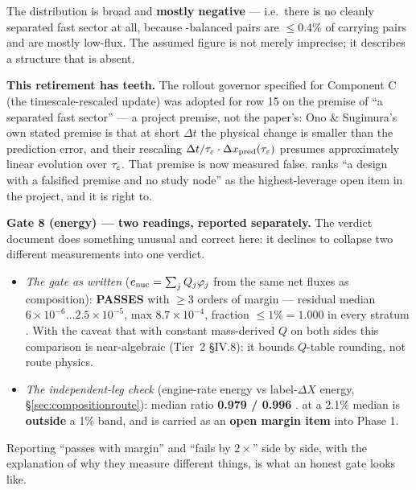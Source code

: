 The distribution is broad and \textbf{mostly negative} --- i.e.\ there is no
cleanly separated fast sector at all, because \kap-balanced pairs are
$\le 0.4\%$ of carrying pairs and are mostly low-flux. The assumed figure is not
merely imprecise; it describes a structure that is absent.

\textbf{This retirement has teeth.} The rollout governor specified for
Component C (the \citealt{ono2026} timescale-rescaled update) was adopted for
row 15 on the premise of ``a separated fast sector'' --- a project premise, not
the paper's: Ono \& Sugimura's own stated premise is that at short $\Delta t$
the physical change is smaller than the prediction error, and their rescaling
$\Delta t/\tau_{\varepsilon} \cdot \Delta x_{\mathrm{pred}}(\tau_{\varepsilon})$ presumes
approximately linear evolution over $\tau_{\varepsilon}$. That premise is now measured
false.  ranks ``a design with a falsified premise and no study
node'' as the highest-leverage open item in the project, and it is right to.

\textbf{Gate 8 (energy) --- two readings, reported separately.} The verdict
document does something unusual and correct here: it declines to collapse two
different measurements into one verdict.

\begin{itemize}
\item \emph{The gate as written} ($e_{\mathrm{nuc}} = \sum_j Q_j \varphi_j$ from the same
  net fluxes as composition): \textbf{PASSES} with $\ge 3$ orders of margin ---
  residual median $6\times10^{-6} \ldots 2.5\times10^{-5}$, max
  $8.7\times10^{-4}$, fraction $\le 1\% = 1.000$ in every stratum
  . With the caveat that with constant mass-derived $Q$
  on both sides this comparison is near-algebraic (Tier~2 \S IV.8): it bounds
  $Q$-table rounding, not route physics.
\item \emph{The independent-leg check} (engine-rate energy vs label-$\Delta X$
  energy, \S\ref{sec:compositionroute}): median ratio \textbf{0.979 / 0.996}
  .  at a 2.1\% median is \textbf{outside} a
  1\% band, and is carried as an \textbf{open margin item} into Phase 1.
\end{itemize}

Reporting ``passes with margin'' and ``fails by $2\times$'' side by side, with
the explanation of why they measure different things, is what an honest gate
looks like.

